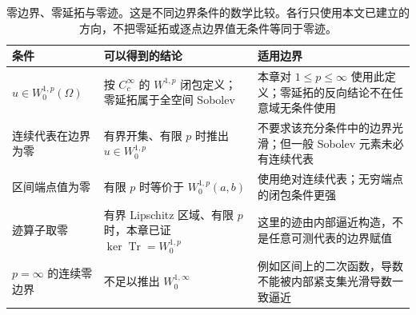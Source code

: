 \begin{table}[htbp]
\centering\small\renewcommand{\arraystretch}{1.18}\setlength{\tabcolsep}{4pt}
\caption[零边界、零延拓与零迹]{零边界、零延拓与零迹。这是不同边界条件的数学比较。各行只使用本文已建立的方向，不把零延拓或逐点边界值无条件等同于零迹。}
\label{b1:tab:visual-t11}
\begin{tabularx}{\linewidth}{@{}>{\raggedright\arraybackslash}p{3.1cm}>{\raggedright\arraybackslash}p{4.7cm}>{\raggedright\arraybackslash}X@{}}
\toprule
条件 & 可以得到的结论 & 适用边界 \\
\midrule
\(u\in W_0^{1,p}(\Omega)\) & 按 \(C_c^\infty\) 的 \(W^{1,p}\) 闭包定义；零延拓属于全空间 Sobolev & 本章对 \(1\le p\le\infty\) 使用此定义；零延拓的反向结论不在任意域无条件使用 \\
连续代表在边界为零 & 有界开集、有限 \(p\) 时推出 \(u\in W_0^{1,p}\) & 不要求该充分条件中的边界光滑；但一般 Sobolev 元素未必有连续代表 \\
区间端点值为零 & 有限 \(p\) 时等价于 \(W_0^{1,p}(a,b)\) & 使用绝对连续代表；无穷端点的闭包条件更强 \\
迹算子取零 & 有界 Lipschitz 区域、有限 \(p\) 时，本章已证 \(\ker\operatorname{Tr}=W_0^{1,p}\) & 这里的迹由内部逼近构造，不是任意可测代表的边界赋值 \\
\(p=\infty\) 的连续零边界 & 不足以推出 \(W_0^{1,\infty}\) & 例如区间上的二次函数，导数不能被内部紧支集光滑导数一致逼近 \\
\bottomrule
\end{tabularx}
\end{table}
